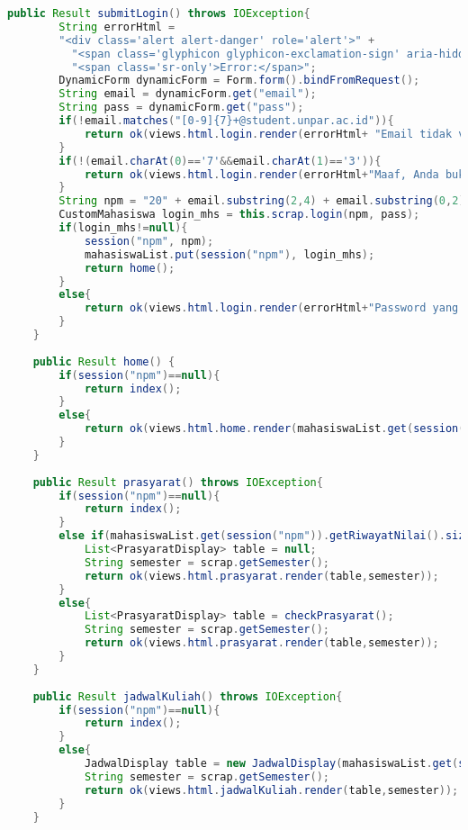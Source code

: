 \begin{lstlisting}[language=Java,basicstyle=\tiny,caption=Application.java]
    public Result submitLogin() throws IOException{
    	String errorHtml = 
    	"<div class='alert alert-danger' role='alert'>" +
    	  "<span class='glyphicon glyphicon-exclamation-sign' aria-hidden='true'></span>"+
    	  "<span class='sr-only'>Error:</span>";
    	DynamicForm dynamicForm = Form.form().bindFromRequest();
    	String email = dynamicForm.get("email");
    	String pass = dynamicForm.get("pass");
    	if(!email.matches("[0-9]{7}+@student.unpar.ac.id")){
    		return ok(views.html.login.render(errorHtml+ "Email tidak valid" + "</div>"));
    	}
    	if(!(email.charAt(0)=='7'&&email.charAt(1)=='3')){
    		return ok(views.html.login.render(errorHtml+"Maaf, Anda bukan mahasiswa teknik informatika"+ "</div>"));
    	}
    	String npm = "20" + email.substring(2,4) + email.substring(0,2)+ "0" + email.substring(4,7);
    	CustomMahasiswa login_mhs = this.scrap.login(npm, pass);
    	if(login_mhs!=null){
    		session("npm", npm);
    		mahasiswaList.put(session("npm"), login_mhs);
    		return home();
    	}
	    else{
	    	return ok(views.html.login.render(errorHtml+"Password yang Anda masukkan salah atau Anda bukan mahasiswa aktif"+ "</div>"));
	    }
    }
    
    public Result home() {
    	if(session("npm")==null){
    		return index();
    	}
    	else{
    		return ok(views.html.home.render(mahasiswaList.get(session("npm"))));	
    	}
    }
    
    public Result prasyarat() throws IOException{
    	if(session("npm")==null){
    		return index();
    	}
    	else if(mahasiswaList.get(session("npm")).getRiwayatNilai().size()==0){
    		List<PrasyaratDisplay> table = null;
	    	String semester = scrap.getSemester();
	    	return ok(views.html.prasyarat.render(table,semester));
    	}
    	else{
	    	List<PrasyaratDisplay> table = checkPrasyarat();
	    	String semester = scrap.getSemester();
	    	return ok(views.html.prasyarat.render(table,semester));
    	}
    }
    
    public Result jadwalKuliah() throws IOException{
    	if(session("npm")==null){
    		return index();
    	}
    	else{
			JadwalDisplay table = new JadwalDisplay(mahasiswaList.get(session("npm")).getJadwalList());
			String semester = scrap.getSemester();
	    	return ok(views.html.jadwalKuliah.render(table,semester));
    	}
    }


\end{lstlisting}
